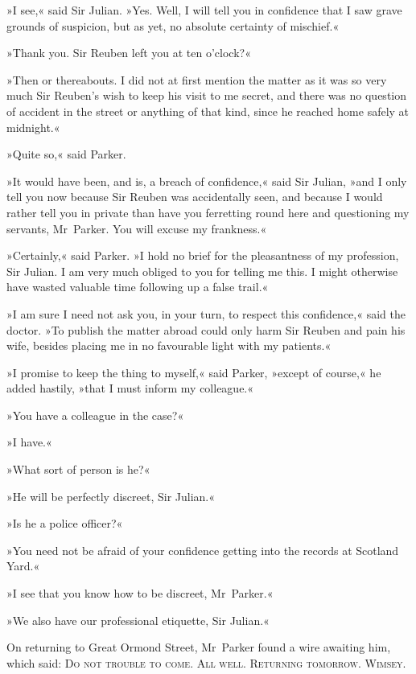 »I see,« said Sir Julian. »Yes. Well, I will tell you in confidence that I saw grave grounds of suspicion, but as yet, no absolute certainty of mischief.«

»Thank you. Sir Reuben left you at ten o'clock?«

»Then or thereabouts. I did not at first mention the matter as it was so very much Sir Reuben's wish to keep his visit to me secret, and there was no question of accident in the street or anything of that kind, since he reached home safely at midnight.«

»Quite so,« said Parker.

»It would have been, and is, a breach of confidence,« said Sir Julian, »and I only tell you now because Sir Reuben was accidentally seen, and because I would rather tell you in private than have you ferretting round here and questioning my servants, Mr~Parker. You will excuse my frankness.«

»Certainly,« said Parker. »I hold no brief for the pleasantness of my profession, Sir Julian. I am very much obliged to you for telling me this. I might otherwise have wasted valuable time following up a false trail.«

»I am sure I need not ask you, in your turn, to respect this confidence,« said the doctor. »To publish the matter abroad could only harm Sir Reuben and pain his wife, besides placing me in no favourable light with my patients.«

»I promise to keep the thing to myself,« said Parker, »except of course,« he added hastily, »that I must inform my colleague.«

»You have a colleague in the case?«

»I have.«

»What sort of person is he?«

»He will be perfectly discreet, Sir Julian.«

»Is he a police officer?«

»You need not be afraid of your confidence getting into the records at Scotland Yard.«

»I see that you know how to be discreet, Mr~Parker.«

»We also have our professional etiquette, Sir Julian.«

On returning to Great Ormond Street, Mr~Parker found a wire awaiting him, which said: \textsc{Do not trouble to come. All well. Returning tomorrow. Wimsey.}